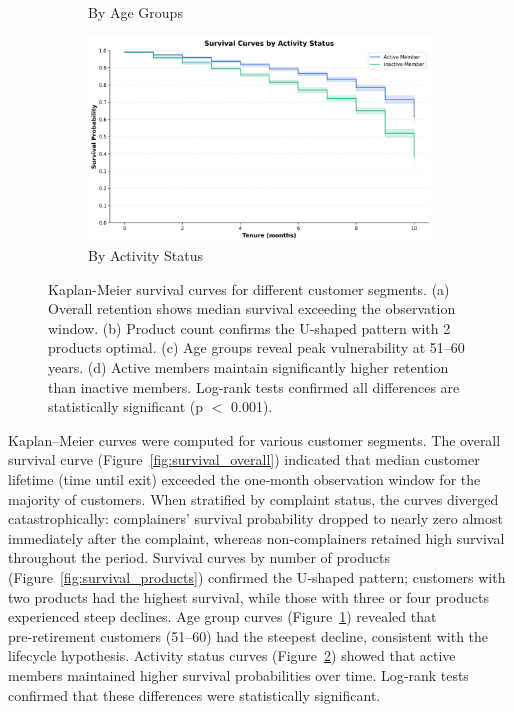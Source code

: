 \documentclass[12pt]{article}
\begin{document}
\begin{figure}[H]
\begin{subfigure}[b]{0.48\textwidth}
\caption{By Age Groups}
\label{fig:survival_age}
\end{subfigure}
\hfill
\begin{subfigure}[b]{0.48\textwidth}
\centering
\includegraphics[width=\textwidth]{img/12_survival_active_status_plot.png}
\caption{By Activity Status}
\label{fig:survival_active}
\end{subfigure}
\caption{Kaplan-Meier survival curves for different customer segments. (a) Overall retention shows median survival exceeding the observation window. (b) Product count confirms the U-shaped pattern with 2 products optimal. (c) Age groups reveal peak vulnerability at 51–60 years. (d) Active members maintain significantly higher retention than inactive members. Log-rank tests confirmed all differences are statistically significant (p $<$ 0.001).}
\label{fig:survival_all}
\end{figure}

Kaplan–Meier curves were computed for various customer segments.  The overall survival curve (Figure~\ref{fig:survival_overall}) indicated that median customer lifetime (time until exit) exceeded the one‑month observation window for the majority of customers.  When stratified by complaint status, the curves diverged catastrophically: complainers' survival probability dropped to nearly zero almost immediately after the complaint, whereas non‑complainers retained high survival throughout the period.  Survival curves by number of products (Figure~\ref{fig:survival_products}) confirmed the U‑shaped pattern; customers with two products had the highest survival, while those with three or four products experienced steep declines.  Age group curves (Figure~\ref{fig:survival_age}) revealed that pre‑retirement customers (51–60) had the steepest decline, consistent with the lifecycle hypothesis.  Activity status curves (Figure~\ref{fig:survival_active}) showed that active members maintained higher survival probabilities over time.  Log‑rank tests confirmed that these differences were statistically significant.
\end{document}
